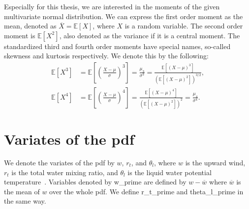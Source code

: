 Especially for this thesis, we are interested in the moments of the given multivariate normal distribution.
We can express the first order moment as the mean,
denoted as $\overline{X} = \mathbb{E}[X]$, where $X$ is a random variable.
The second order moment is $\mathbb{E}[X^2]$, also denoted as the variance if it is a central moment.
The standardized third and fourth order moments have special names,
so-called skewness and kurtosis respectively.
We denote this by the following:
\begin{align}
    \mathbb{E}[X^3]
    &= \mathbb{E}\left[\left(\frac{X-\mu}{\sigma}\right)^3\right]
    = \frac{\mu_3}{\sigma^3}
    = \frac{\mathbb{E}[(X-\mu)^3]}{(\mathbb{E}[(X-\mu)^2])^{3/2}}, \\
    \mathbb{E}[X^4]
    &= \mathbb{E}\left[\left(\frac{X-\mu}{\sigma}\right)^4\right]
    = \frac{\mathbb{E}[(X-\mu)^4]}{(\mathbb{E}[(X-\mu)^2])^2}
    = \frac{\mu_4}{\sigma^4}.
\end{align}


\section{Variates of the pdf}\label{sec:variates-of-the-pdf}

We denote the variates of the \gls{pdf} by $w$, $r_t$, and $\theta_l$,
where $w$ is the upward wind, $r_t$ is the total water mixing ratio,
and $\theta_l$ is the liquid water potential temperature~\autocite[p. 10]{larson2022clubbsilhs}.
Variables denoted by \gls{w_prime} are defined by $w - \overline{w}$
where $\overline{w}$ is the mean of $w$ over the whole pdf.
We define \gls{r_t_prime} and \gls{theta_l_prime} in the same way.